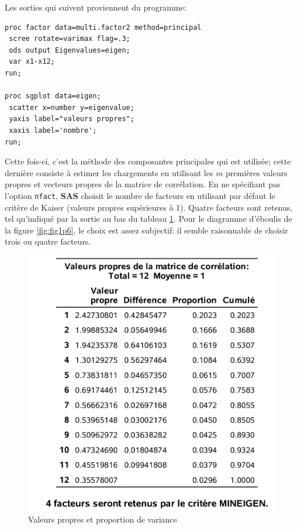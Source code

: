 \documentclass[
  11pt,
  letterpaper,
]{book}
\theoremstyle{definition}
\theoremstyle{definition}
\theoremstyle{definition}
\theoremstyle{remark}
\begin{document}
Les sorties qui suivent proviennent du programme:

\begin{verbatim}
proc factor data=multi.factor2 method=principal
 scree rotate=varimax flag=.3;
 ods output Eigenvalues=eigen;
 var x1-x12;
run; 

proc sgplot data=eigen;
 scatter x=number y=eigenvalue;
 yaxis label="valeurs propres";
 xaxis label='nombre';
run;
\end{verbatim}

Cette fois-ci, c'est la méthode des composantes principales qui est utilisée; cette dernière consiste à estimer les chargements en utilisant les \(m\) premières valeurs propres et vecteurs propres de la matrice de corrélation. En ne spécifiant pas l'option \texttt{nfact}, \textbf{SAS} choisit le nombre de facteurs en utilisant par défaut le critère de Kaiser (valeurs propres supérieures à 1). Quatre facteurs sont retenus, tel qu'indiqué par la sortie au bas du tableau \ref{fig:fig1p7}. Pour le diagramme d'éboulis de la figure \ref{fig:fig1p6}, le choix est assez subjectif: il semble raisonnable de choisir trois ou quatre facteurs.

\begin{figure}

{\centering \includegraphics[width=0.65\linewidth]{figures/01-facto-e7} 

}

\caption{Valeurs propres et proportion de variance}\label{fig:fig1p7}
\end{figure}
\end{document}

